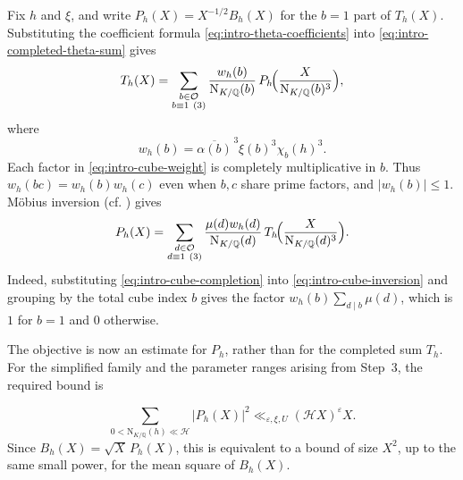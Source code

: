 \documentclass[11pt,a4paper]{article}
\numberwithin{equation}{section}
\numberwithin{figure}{section}
\theoremstyle{definition}
\theoremstyle{remark}
\newcommand{\Q}{\mathbb Q}
\newcommand{\NK}{\mathrm N_{K/\Q}}
\newcommand{\OO}{\mathcal O}
\begin{document}
Fix $h$ and $\xi$, and write $P_h(X)=X^{-1/2}B_h(X)$ for the $b=1$ part of $T_h(X)$. Substituting the coefficient formula \eqref{eq:intro-theta-coefficients} into \eqref{eq:intro-completed-theta-sum} gives
\begin{equation}\label{eq:intro-cube-completion}
 T_h(X)=\sum_{\substack{b\in\OO\\b\equiv1\ (3)}}\frac{w_h(b)}{\NK(b)}\,
                  P_h\!\Bigl(\frac{X}{\NK(b)^3}\Bigr),
\end{equation}
where
\begin{equation}\label{eq:intro-cube-weight}
 w_h(b)=\overline{\alpha(b)}^{\,3}\xi(b)^3\chi_b(h)^3.
\end{equation}
Each factor in \eqref{eq:intro-cube-weight} is completely multiplicative in $b$. Thus $w_h(bc)=w_h(b)w_h(c)$ even when $b,c$ share prime factors, and $|w_h(b)|\le1$. M\"obius inversion (cf. \cite[\S1.3]{IK04}) gives
\begin{equation}\label{eq:intro-cube-inversion}
 P_h(X)=\sum_{\substack{d\in\OO\\d\equiv1\ (3)}}\frac{\mu(d)w_h(d)}{\NK(d)}\,
                  T_h\!\Bigl(\frac{X}{\NK(d)^3}\Bigr).
\end{equation}
Indeed, substituting \eqref{eq:intro-cube-completion} into \eqref{eq:intro-cube-inversion} and grouping by the total cube index $b$ gives the factor $w_h(b)\sum_{d\mid b}\mu(d)$, which is $1$ for $b=1$ and $0$ otherwise.


The objective is now an estimate for $P_h$, rather than for the
completed sum $T_h$. For the simplified family and the parameter
ranges arising from Step~3, the required bound is

\begin{equation}\label{eq:intro-cube-target}
 \sum_{0<\NK(h)\ll\mathcal H}|P_h(X)|^2
       \ll_{\varepsilon,\xi,U}(\mathcal H X)^\varepsilon X.
\end{equation}
Since $B_h(X)=\sqrt X\,P_h(X)$, this is equivalent to a bound of size $X^2$, up to the same small power, for the mean square of $B_h(X)$.
\end{document}
